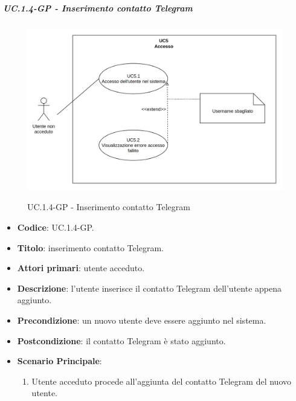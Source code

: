 				\subparagraph{UC\theuccount.1.4-GP - Inserimento contatto Telegram}
					\begin{figure}[H]
						\centering
						\includegraphics[width=\columnwidth]{img/UC5.png}\\
						\caption{UC\theuccount.1.4-GP - Inserimento contatto Telegram}
					\end{figure}
					\begin{itemize}
						\item \textbf{Codice}: UC\theuccount.1.4-GP.
						\item \textbf{Titolo}: inserimento contatto Telegram.
						\item \textbf{Attori primari}: utente acceduto.
						\item \textbf{Descrizione}: l'utente inserisce il contatto Telegram dell'utente appena aggiunto.
						\item \textbf{Precondizione}: un nuovo utente deve essere aggiunto nel sistema.
						\item \textbf{Postcondizione}: il contatto Telegram è stato aggiunto.
						\item \textbf{Scenario Principale}:
						\begin{enumerate}
							\item Utente acceduto procede all'aggiunta del contatto Telegram del nuovo utente.
						\end{enumerate}
					\end{itemize}

